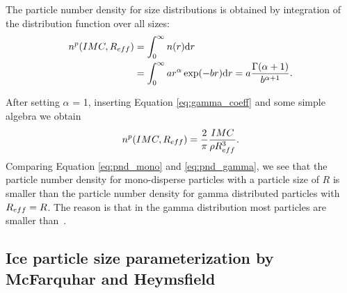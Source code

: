 The particle number density for size distributions is obtained by
integration of the distribution function over all sizes:
\begin{eqnarray}
  n^p(IMC, R_{eff}) &= \int_0^\infty {n(r)\ensuremath{\mathrm{d}}r} \\
 &= \int_0^\infty {a  r^\alpha \exp(-br)
    \ensuremath{\mathrm{d}}r} = a \frac{\Gamma(\alpha+1)}{b^{\alpha+1}}.
\end{eqnarray}

After setting $\alpha$ = 1, inserting Equation \ref{eq:gamma_coeff} and
some simple algebra we obtain
\begin{equation}
  \label{eq:pnd_gamma}
  n^p(IMC, R_{eff}) = \frac{2}{\pi} \frac{IMC}{\rho R_{eff}^3}.
\end{equation}
Comparing Equation \ref{eq:pnd_mono} and \ref{eq:pnd_gamma}, we see
that the particle number density for mono-disperse particles with a
particle size of $R$ is smaller than the particle number density for
gamma distributed particles with $R_{eff}=R$. The reason is that in the
gamma distribution most particles are smaller than~\Reff.

\subsection[McFarquhar and Heymsfield parametrization]
{Ice particle size parameterization by McFarquhar and Heymsfield}
\label{sec:McFHey_distr}


